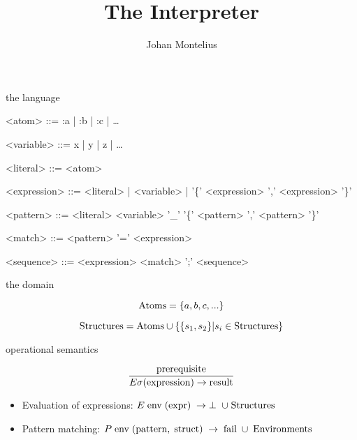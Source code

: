 
\usepackage{cancel}

\title[ID1019 Interpreter]{The Interpreter}


\author{Johan Montelius}
\date{\semester}



\begin{frame}
\titlepage
\end{frame}


\begin{frame}{the language}
  
\begin{grammar}
<atom> ::= :a | :b | :c | \ldots

<variable> ::= x | y | z | \ldots

<literal> ::= <atom>

<expression> ::= <literal> | <variable> |  '\{' <expression> ',' <expression> '\}'

<pattern> ::= <literal> 
      \alt <variable> 
      \alt '\_' 
      \alt '\{' <pattern> ',' <pattern> '\}'

<match> ::=  <pattern> '=' <expression>

<sequence> ::=  <expression> \alt <match> ';' <sequence>
\end{grammar}

\end{frame} 

\begin{frame}{the domain}


$${\rm Atoms} =  \{a,b,c, ...\}$$

$${\rm Structures} = {\rm Atoms} \cup \{\{s_1, s_2\} | s_i \in {\rm Structures}\}$$

\end{frame}


\begin{frame}{operational semantics}

\vspace{10pt}
$$\frac{{\rm prerequisite}}{E\sigma({\rm expression}) \rightarrow {\rm result}}$$

\vspace{20pt}

\begin{itemize}
\item Evaluation of expressions: $E\; {\rm env}\; ({\rm expr}) \; \rightarrow \; \perp \; \cup \; {\rm Structures}$
\item Pattern matching: $P\; {\rm env}\; ({\rm pattern}, \; {\rm struct})\;  \rightarrow \; {\rm fail} \; \cup\;  {\rm Environments}$
\end{itemize}

\vspace{40pt}{\em This is called ``big step'' operational semantics.''}

\end{frame}


